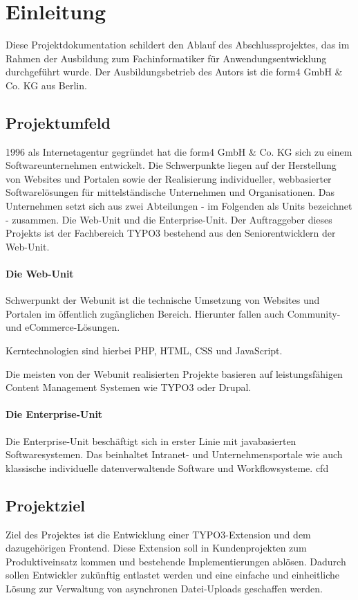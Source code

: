\section{Einleitung}
\label{sec:Einleitung}
Diese Projektdokumentation schildert den Ablauf des Abschlussprojektes, das im Rahmen der Ausbildung zum Fachinformatiker für Anwendungsentwicklung durchgeführt wurde. Der Ausbildungsbetrieb des Autors ist die form4 GmbH \& Co. KG aus Berlin.

\subsection{Projektumfeld} 
\label{sec:Projektumfeld}
1996 als Internetagentur gegründet hat die form4 GmbH \& Co. KG sich zu einem Softwareunternehmen entwickelt. Die Schwerpunkte liegen auf der Herstellung von Websites und Portalen sowie der Realisierung individueller, webbasierter Softwarelösungen für mittelständische Unternehmen und Organisationen. Das Unternehmen setzt sich aus zwei Abteilungen - im Folgenden als Units bezeichnet - zusammen. Die Web-Unit und die Enterprise-Unit. Der Auftraggeber dieses Projekts ist der Fachbereich TYPO3 bestehend aus den Seniorentwicklern der Web-Unit.

\paragraph{Die Web-Unit}
Schwerpunkt der Webunit ist die technische Umsetzung von Websites und Portalen im öffentlich zugänglichen Bereich. Hierunter fallen auch Community- und eCommerce-Lösungen.

Kerntechnologien sind hierbei PHP, HTML, CSS und JavaScript.

Die meisten von der Webunit realisierten Projekte basieren auf leistungsfähigen Content Management Systemen wie TYPO3 oder Drupal.

\paragraph{Die Enterprise-Unit}
Die Enterprise-Unit beschäftigt sich in erster Linie mit javabasierten Softwaresystemen. Das beinhaltet Intranet- und Unternehmensportale wie auch klassische individuelle datenverwaltende Software und Workflowsysteme.
cfd

\subsection{Projektziel} 
\label{sec:Projektziel}
Ziel des Projektes ist die Entwicklung einer TYPO3-Extension und dem dazugehörigen Frontend. Diese Extension soll in Kundenprojekten zum Produktiveinsatz kommen und bestehende Implementierungen ablösen. Dadurch sollen Entwickler zukünftig entlastet werden und eine einfache und einheitliche Lösung zur Verwaltung von asynchronen Datei-Uploads geschaffen werden. 


